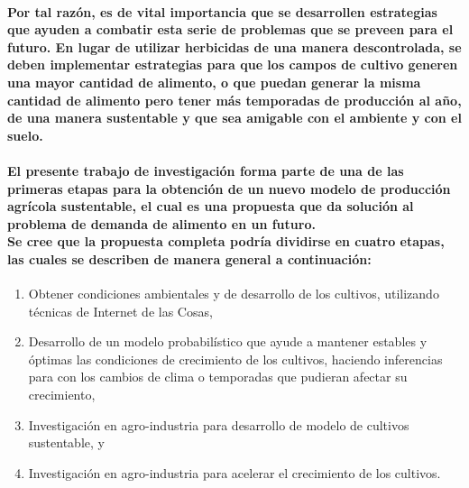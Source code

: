 \documentclass[10pt, twocolumn]{article}
\begin{document}
\paragraph{Por tal razón, es de vital importancia que se desarrollen estrategias que ayuden a combatir esta serie de problemas que se preveen para el futuro. En lugar de utilizar herbicidas de una manera descontrolada, se deben implementar estrategias para que los campos de cultivo generen una mayor cantidad de alimento, o que puedan generar la misma cantidad de alimento pero tener más temporadas de producción al año, de una manera sustentable y que sea amigable con el ambiente y con el suelo.}

\paragraph{El presente trabajo de investigación forma parte de una de las primeras etapas para la obtención de un nuevo modelo de producción agrícola sustentable, el cual es una propuesta que da solución al problema de demanda de alimento en un futuro. \\ Se cree que la propuesta completa podría dividirse en cuatro etapas, las cuales se describen de manera general a continuación:}
\begin{enumerate}
	\item{Obtener condiciones ambientales y de desarrollo de los cultivos, utilizando técnicas de Internet de las Cosas,}
	\item{Desarrollo de un modelo probabilístico que ayude a mantener estables y óptimas las condiciones de crecimiento de los cultivos, haciendo inferencias para con los cambios de clima o temporadas que pudieran afectar su crecimiento,}
	\item{Investigación en agro-industria para desarrollo de modelo de cultivos sustentable, y}
	\item{Investigación en agro-industria para acelerar el crecimiento de los cultivos.}
\end{enumerate}
\end{document}
